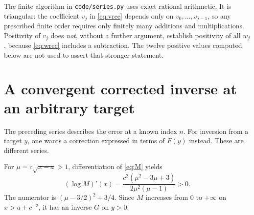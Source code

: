 \documentclass[11pt]{article}
\numberwithin{equation}{section}
\theoremstyle{definition}
\theoremstyle{remark}
\begin{document}
The finite algorithm in \texttt{code/series.py} uses exact rational
arithmetic. It is triangular: the coefficient $v_j$ in
\eqref{eq:vrec} depends only on $v_0,\ldots,v_{j-1}$, so any prescribed
finite order requires only finitely many additions and multiplications.
Positivity of $v_j$ does \emph{not}, without a further argument,
establish positivity of all $w_j$, because \eqref{eq:wrec} includes a
subtraction. The twelve positive values computed below are not used to
assert that stronger statement.

\section{A convergent corrected inverse at an arbitrary target}\label{sec:correctedinverse}
The preceding series describes the error at a known index $n$. For
inversion from a target $y$, one wants a correction expressed in terms
of $F(y)$ instead. These are different series.

For $\mu=c\sqrt{x-a}>1$, differentiation of \eqref{eq:M} yields
\begin{equation}\label{eq:Mderivative}
 (\log M)'(x)
 =\frac{c^2(\mu^2-3\mu+3)}{2\mu^2(\mu-1)}>0.
\end{equation}
The numerator is $(\mu-3/2)^2+3/4$. Since $M$ increases from $0$ to
$+\infty$ on $x>a+c^{-2}$, it has an inverse $G$ on $y>0$.
\end{document}
